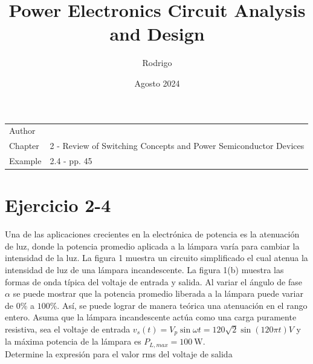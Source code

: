 \documentclass{article}
\title{Power Electronics Circuit Analysis and Design  }
\author{Rodrigo}
\date{Agosto 2024}
\begin{document}
	
	\maketitle
	
	\noindent\begin{tabular}{@{}ll}
		Author & \theauthor\\
		Chapter &  2 - Review of Switching Concepts and Power Semiconductor Devices\\
		Example & 2.4 - pp. 45
	\end{tabular}
	
	\section*{Ejercicio 2-4}
	Una de las aplicaciones crecientes en la electrónica de potencia es la atenuación de luz, donde la potencia promedio aplicada a la lámpara varía para cambiar la intensidad de la luz. La figura 1 muestra un circuito simplificado el cual atenua la intensidad de luz de una lámpara incandescente. La figura 1(b) muestra las formas de onda típica del voltaje de entrada y salida. Al variar el ángulo de fase $\alpha$ se puede mostrar que la potencia promedio liberada a la lámpara puede variar de $0\%$ a $100\%$. Así, se puede lograr de manera teórica una atenuación en el rango entero. Asuma que la lámpara incandescente actúa como una carga puramente resistiva, sea el voltaje de entrada $v_s(t) = V_p \sin \omega t = 120 \sqrt{2} \sin (120 \pi t) V$ y la máxima potencia de la lámpara es $P_{L, max} = \qty{100}{\watt}$. \\
	
	\noindent Determine la expresión para el valor rms del voltaje de salida 
	
\end{document}

